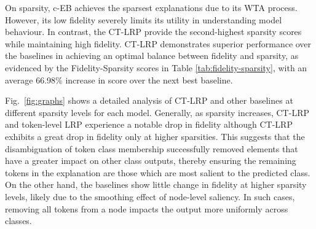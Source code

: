 On sparsity, c-EB achieves the sparsest explanations due to its WTA process. However, its low fidelity severely limits its utility in understanding model behaviour. In contrast, the CT-LRP provide the second-highest sparsity scores while maintaining high fidelity. CT-LRP demonstrates superior performance over the baselines in achieving an optimal balance between fidelity and sparsity, as evidenced by the Fidelity-Sparsity scores in Table \ref{tab:fidelity-sparsity}, with an average 66.98\% increase in score over the next best baseline.






Fig.~\ref{fig:graphs} shows a detailed analysis of CT-LRP and other baselines at different sparsity levels for each model. Generally, as sparsity increases, CT-LRP and token-level LRP experience a notable drop in fidelity although CT-LRP exhibits a great drop in fidelity only at higher sparsities. This suggests that the disambiguation of token class membership successfully removed elements that have a greater impact on other class outputs, thereby ensuring the remaining tokens in the explanation are those which are most salient to the predicted class. On the other hand, the baselines show little change in fidelity at higher sparsity levels, likely due to the smoothing effect of node-level saliency. In such cases, removing all tokens from a node impacts the output more uniformly across classes.

